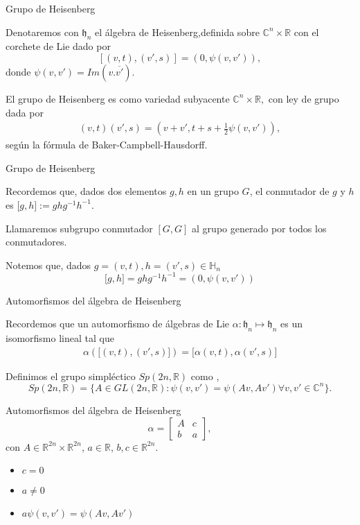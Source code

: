 \documentclass{beamer}
\begin{document}
\begin{frame}{Grupo de Heisenberg}
\begin{definition}
Denotaremos con $\mathfrak{h}_n$ el álgebra de Heisenberg,definida sobre
$\mathbb{C}^n \times \mathbb{R}$  con el corchete de Lie dado por 
$$
[(v,t),(v',s)]=(0,\psi(v,v')),
$$
donde  $\psi (v,v')=Im(v.\overline{v'}).$
\end{definition} 

\begin{definition}
El grupo de Heisenberg es como variedad subyacente $\mathbb{C}^{n}\times \mathbb{R},$ con
ley de grupo dada por 
$$\begin{aligned}
(v,t)(v',s)=(v+v',t+s+ \frac{1}{2} \psi(v,v')),
\end{aligned}$$
según la fórmula de Baker-Campbell-Hausdorff.
\end{definition}
\end{frame}


\begin{frame}{Grupo de Heisenberg}
\begin{definition}
 Recordemos que, dados dos elementos $g,h$ en un grupo $G$, el conmutador de $g$ y $h$ es ${[}g,h{]}:=g h g^{-1} h^{-1}$.
 
 Llamaremos subgrupo conmutador $[G,G]$ al grupo generado por todos los conmutadores.
\end{definition}
Notemos que, dados $g=(v,t),h=(v',s) \in \mathbb{H}_n$
$$
{[}g,h{]}=g h g^{-1} h^{-1}=(0,\psi(v,v'))
$$
\end{frame}

\begin{frame}{Automorfismos del álgebra de Heisenberg}
 \begin{definition}
 Recordemos que un automorfismo de álgebras de Lie $\alpha: \mathfrak{h}_n \mapsto \mathfrak{h}_n$ es un isomorfismo lineal tal que 
 $$\begin{aligned}
    \alpha({[}(v,t),(v',s){]})={[}\alpha(v,t),\alpha(v',s){]}
 \end{aligned}$$
\end{definition}
\begin{definition}
 Definimos el grupo simpléctico $Sp(2n,\mathbb{R})$ como ,
 $$
 Sp(2n,\mathbb{R})=\{ A \in GL(2n,\mathbb{R}): \psi(v,v')=\psi(Av,Av') \forall v,v' \in \mathbb{C}^n\}.
 $$
\end{definition}

\end{frame}

\begin{frame}{Automorfismos del álgebra de Heisenberg}
$$\alpha=
\begin{bmatrix}
A & c\\
b & a
\end{bmatrix},$$
con $A \in  \mathbb{R}^{2n} \times \mathbb{R}^{2n}$, $a \in \mathbb{R}$, $b,c \in \mathbb{R}^{2n}$.

\begin{itemize}
\item <2-> $c=0$
\item <2-> $a\neq0$
\item <2-> $a \psi(v,v')=\psi(A v,A v')$
\end{itemize}
\end{frame}
\end{document}
